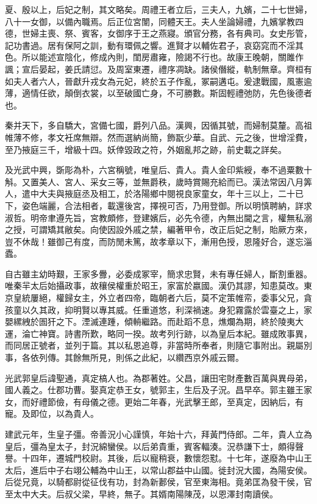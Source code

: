 
\begin{pinyinscope}
夏、殷以上，后妃之制，其文略矣。周禮王者立后，三夫人，九嬪，二十七世婦，八十一女御，以備內職焉。后正位宮闈，同體天王。夫人坐論婦禮，九嬪掌教四德，世婦主喪、祭、賓客，女御序于王之燕寢。頒官分務，各有典司。女史彤管，記功書過。居有保阿之訓，動有環佩之響。進賢才以輔佐君子，哀窈窕而不淫其色。所以能述宣陰化，修成內則，閨房肅雍，險謁不行也。故康王晚朝，關雎作諷；宣后晏起，姜氏請愆。及周室東遷，禮序凋缺。諸侯僭縱，軌制無章。齊桓有如夫人者六人，晉獻升戎女為元妃，終於五子作亂，冢嗣遘屯。爰逮戰國，風憲逾薄，適情任欲，顛倒衣裳，以至破國亡身，不可勝數。斯固輕禮弛防，先色後德者也。

秦并天下，多自驕大，宮備七國，爵列八品。漢興，因循其號，而婦制莫釐。高祖帷薄不修，孝文衽席無辯。然而選納尚簡，飾翫少華。自武、元之後，世增淫費，至乃掖庭三千，增級十四。妖倖毀政之符，外姻亂邦之跡，前史載之詳矣。

及光武中興，斲彫為朴，六宮稱號，唯皇后、貴人。貴人金印紫綬，奉不過粟數十斛。又置美人、宮人、采女三等，並無爵秩，歲時賞賜充給而已。漢法常因八月筭人，遣中大夫與掖庭丞及相工，於洛陽鄉中閱視良家童女，年十三以上，二十已下，姿色端麗，合法相者，載還後宮，擇視可否，乃用登御。所以明慎聘納，詳求淑哲。明帝聿遵先旨，宮教頗修，登建嬪后，必先令德，內無出閫之言，權無私溺之授，可謂矯其敝矣。向使因設外戚之禁，編著甲令，改正后妃之制，貽厥方來，豈不休哉！雖御己有度，而防閒未篤，故孝章以下，漸用色授，恩隆好合，遂忘淄蠹。

自古雖主幼時艱，王家多釁，必委成冢宰，簡求忠賢，未有專任婦人，斷割重器。唯秦羋太后始攝政事，故穰侯權重於昭王，家富於嬴國。漢仍其謬，知患莫改。東京皇統屢絕，權歸女主，外立者四帝，臨朝者六后，莫不定策帷帟，委事父兄，貪孩童以久其政，抑明賢以專其威。任重道悠，利深禍速。身犯霧露於雲臺之上，家嬰縲絏於圄犴之下。湮滅連踵，傾輈繼路。而赴蹈不息，燋爛為期，終於陵夷大運，淪亡神寶。詩書所歎，略同一揆。故考列行跡，以為皇后本紀。雖成敗事異，而同居正號者，並列于篇。其以私恩追尊，非當時所奉者，則隨它事附出。親屬別事，各依列傳。其餘無所見，則係之此紀，以纘西京外戚云爾。

光武郭皇后諱聖通，真定槁人也。為郡著姓。父昌，讓田宅財產數百萬與異母弟，國人義之。仕郡功曹。娶真定恭王女，號郭主，生后及子況。昌早卒。郭主雖王家女，而好禮節儉，有母儀之德。更始二年春，光武擊王郎，至真定，因納后，有寵。及即位，以為貴人。

建武元年，生皇子彊。帝善況小心謹慎，年始十六，拜黃門侍郎。二年，貴人立為皇后，彊為皇太子，封況綿蠻侯。以后弟貴重，賓客輻湊。況恭謙下士，頗得聲譽。十四年，遷城門校尉。其後，后以寵稍衰，數懷怨懟。十七年，遂廢為中山王太后，進后中子右翊公輔為中山王，以常山郡益中山國。徙封況大國，為陽安侯。后從兄竟，以騎都尉從征伐有功，封為新郪侯，官至東海相。竟弟匡為發干侯，官至太中大夫。后叔父梁，早終，無子。其婿南陽陳茂，以恩澤封南讀侯。


\end{pinyinscope}
